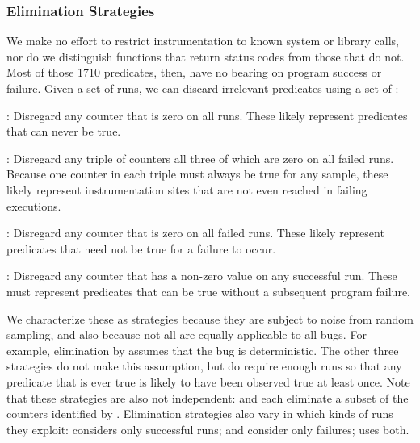 \subsubsection{Elimination Strategies}

We make no effort to restrict instrumentation to known
system or library calls, nor do we distinguish
functions that return status codes from those that do not.  
Most of those 1710 predicates,
then, have no bearing on program success or failure.
Given a set of runs, we can discard irrelevant predicates using a 
set of :

\begin{elimlist}
  \begin{sloppypar}
  \item[\elim{Elimination by universal falsehood}:] Disregard any
    counter that is zero on all runs.  These likely represent
    predicates that can never be true.
  \end{sloppypar}

\item[\elim{Elimination by lack of failing coverage}:] Disregard any
  triple of counters all three of which are zero on all failed runs.
  Because one counter in each triple must always be true for any
  sample, these likely represent instrumentation sites that are not
  even reached in failing executions.
  
\item[\elim{Elimination by lack of failing example}:] Disregard any
  counter that is zero on all failed runs.  These likely represent
  predicates that need not be true for a failure to occur.
  
\item[\elim{Elimination by successful counterexample}:] Disregard any
  counter that has a non-zero value on any successful run.  These
  must represent predicates that can be true without a subsequent
  program failure.
\end{elimlist}

We characterize these as strategies because they are subject to noise
from random sampling, and also because not all are equally applicable
to all bugs.  For example, elimination by  assumes that the bug is deterministic.  The other three
strategies do not make this assumption, but do require enough
runs so that any predicate that is ever true is likely to
have been observed true at least once.  Note that these
strategies are also not independent:  and
 each eliminate a subset of the
counters identified by .  Elimination
strategies also vary in which kinds of runs they exploit:
 considers only successful runs;
 and 
consider only failures;  uses both.

